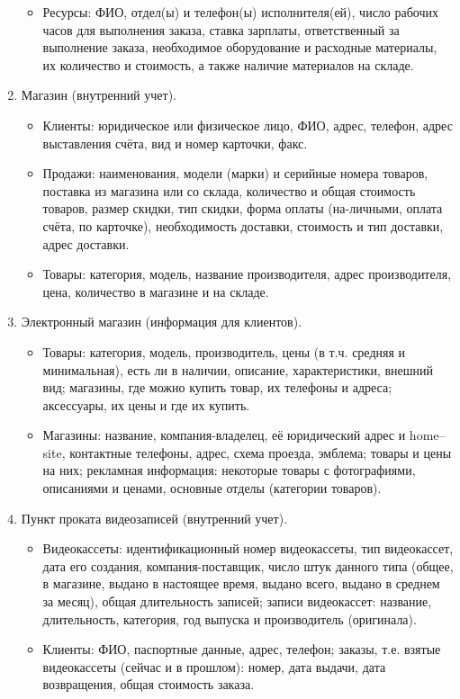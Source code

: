 \documentclass[12pt, openany, twoside]{book} %
\begin{document}
\begin{enumerate}
\begin{itemize}
\item Ресурсы: ФИО, отдел(ы) и телефон(ы) исполнителя(ей), число рабочих часов для выполнения заказа, ставка зарплаты, ответственный за выполнение заказа, необходимое оборудование и расходные материалы, их количество и стоимость, а также наличие материалов на складе.
\end{itemize}
\item Магазин (внутренний учет).
\begin{itemize}
\item Клиенты: юридическое или физическое лицо, ФИО, адрес, телефон, адрес выставления счёта, вид и номер карточки, факс.
\item Продажи: наименования, модели (марки) и серийные номера товаров, поставка из магазина или со склада, количество и общая стоимость товаров, размер скидки, тип скидки, форма оплаты (на-личными, оплата счёта, по карточке), необходимость доставки, стоимость и тип доставки, адрес доставки.
\item Товары: категория, модель, название производителя, адрес производителя, цена, количество в магазине и на складе.
\end{itemize}
\item Электронный магазин (информация для клиентов).
\begin{itemize}
\item Товары: категория, модель, производитель, цены (в т.ч. средняя и минимальная), есть ли в наличии, описание, характеристики, внешний вид; магазины, где можно купить товар, их телефоны и адреса; аксессуары, их цены и где их купить.
\item Магазины: название, компания-владелец, её юридический адрес и home--site, контактные телефоны, адрес, схема проезда, эмблема; товары и цены на них; рекламная информация: некоторые товары с фотографиями, описаниями и ценами, основные отделы (категории товаров).
\end{itemize}
\item Пункт проката видеозаписей (внутренний учет).
\begin{itemize}
\item Видеокассеты: идентификационный номер видеокассеты, тип видеокассет, дата его создания, компания-поставщик, число штук данного типа (общее, в магазине, выдано в настоящее время, выдано всего, выдано в среднем за месяц), общая длительность записей; записи видеокассет: название, длительность, категория, год выпуска и производитель (оригинала).
\item Клиенты: ФИО, паспортные данные, адрес, телефон; заказы, т.е. взятые видеокассеты (сейчас и в прошлом): номер, дата выдачи, дата возвращения, общая стоимость заказа.

\end{itemize}
\end{enumerate}
\end{document}
